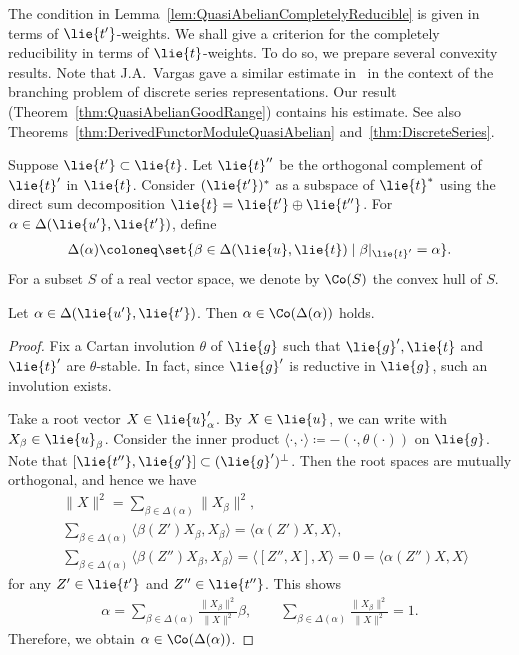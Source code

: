 The condition in Lemma~\ref{lem:QuasiAbelianCompletelyReducible} is given in terms of $\lie{t'}$-weights.
We shall give a criterion for the completely reducibility in terms of $\lie{t}$-weights.
To do so, we prepare several convexity results.
Note that J.A.~Vargas gave a similar estimate in~\cite[\S(1.5)]{Va16} in the context of the branching problem of discrete series representations.
Our result (Theorem~\ref{thm:QuasiAbelianGoodRange}) contains his estimate.
See also Theorems~\ref{thm:DerivedFunctorModuleQuasiAbelian} and~\ref{thm:DiscreteSeries}.

Suppose $\lie{t'}\subset \lie{t}$.
Let $\lie{t}''$ be the orthogonal complement of $\lie{t}'$ in $\lie{t}$.
Consider $(\lie{t'})^*$ as a subspace of $\lie{t}^*$
using the direct sum decomposition $\lie{t}=\lie{t'} \oplus \lie{t''}$.
For $\alpha \in \Delta(\lie{u'}, \lie{t'})$, define
\begin{align*}
	\Delta(\alpha)\coloneq \set{\beta \in \Delta(\lie{u}, \lie{t})\mid \beta|_{\lie{t}'}=\alpha}.
\end{align*}
For a subset $S$ of a real vector space, we denote by $\Co(S)$ the convex hull of $S$.

\begin{Lemma}\label{lem:ConvexityRestriction}
	Let $\alpha \in \Delta(\lie{u'}, \lie{t'})$.
	Then $\alpha \in \Co(\Delta(\alpha))$ holds.
\end{Lemma}

\begin{proof}
	Fix a Cartan involution $\theta$ of $\lie{g}$ such that
	$\lie{g}', \lie{t}$ and $\lie{t}'$ are $\theta$-stable.
	In fact, since $\lie{g}'$ is reductive in $\lie{g}$, such an involution exists.

	Take a root vector $X \in \lie{u}'_{\alpha}$.
	By $X \in \lie{u}$, we can write  with $X_{\beta} \in \lie{u}_{\beta}$.
	Consider the inner product $\langle \cdot, \cdot \rangle \coloneq -(\cdot, \theta(\cdot))$ on $\lie{g}$.
	Note that $[\lie{t''}, \lie{g'}] \subset (\lie{g}')^\perp$.
	Then the root spaces are mutually orthogonal, and hence we have
	\begin{align*}
		&\|X\|^2= \sum_{\beta \in \Delta(\alpha)} \|X_\beta\|^2, \\
		&\sum_{\beta \in \Delta(\alpha)} \langle \beta(Z')X_\beta, X_\beta\rangle= \langle \alpha(Z')X, X\rangle, \\
		&\sum_{\beta \in \Delta(\alpha)} \langle \beta(Z'')X_\beta, X_\beta\rangle= \langle [Z'', X], X\rangle = 0 = \langle \alpha(Z'')X, X\rangle
	\end{align*}
	for any $Z' \in \lie{t'}$ and $Z'' \in \lie{t''}$.
	This shows
	\begin{align*}
		\alpha = \sum_{\beta \in \Delta(\alpha)} \frac{\|X_\beta\|^2}{\|X\|^2} \beta, \qquad \sum_{\beta \in \Delta(\alpha)} \frac{\|X_\beta\|^2}{\|X\|^2} = 1.
	\end{align*}
	Therefore, we obtain $\alpha \in \Co(\Delta(\alpha))$.
\end{proof}


